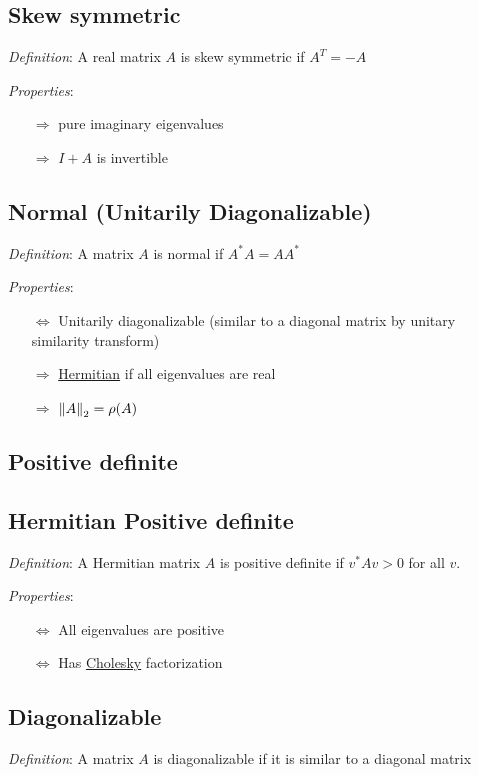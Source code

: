 \documentclass[12pt]{article}
\begin{document}
\subsection{Skew symmetric}
\textit{Definition}: A real matrix \( A \) is skew symmetric if \( A^T = -A \)

\textit{Properties}:
\begin{itemize}[nolistsep]
    \item[\(\Rightarrow\)] pure imaginary eigenvalues
    \item[\(\Rightarrow\)] \( I+A \) is invertible
\end{itemize}


\subsection{Normal (Unitarily Diagonalizable)}
\label{sec:normal}
\textit{Definition}: A matrix \( A \) is normal if \( A^*A = AA^* \)

\textit{Properties}:
\begin{itemize}[nolistsep]
    \item[\(\Leftrightarrow\)] Unitarily diagonalizable (similar to a diagonal matrix by unitary similarity transform)
    \item[\(\Rightarrow\)] \hyperref[sec:hermitian]{Hermitian} if all eigenvalues are real
    \item[\(\Rightarrow\)] \( \left\lVert A\right\rVert_2 = \rho(A) \)
\end{itemize}

\subsection{Positive definite}

\subsection{Hermitian Positive definite}
\textit{Definition}: A Hermitian matrix \( A \) is positive definite if \( v^*Av > 0 \) for all \( v \).

\textit{Properties}:
\begin{itemize}[nolistsep]
    \item[\(\Leftrightarrow\)] All eigenvalues are positive
    \item[\(\Leftrightarrow\)] Has \hyperref[sec:cholesky]{Cholesky} factorization
\end{itemize}

\subsection{Diagonalizable}
\textit{Definition}: A matrix \( A \) is diagonalizable if it is similar to a diagonal matrix
\end{document}
